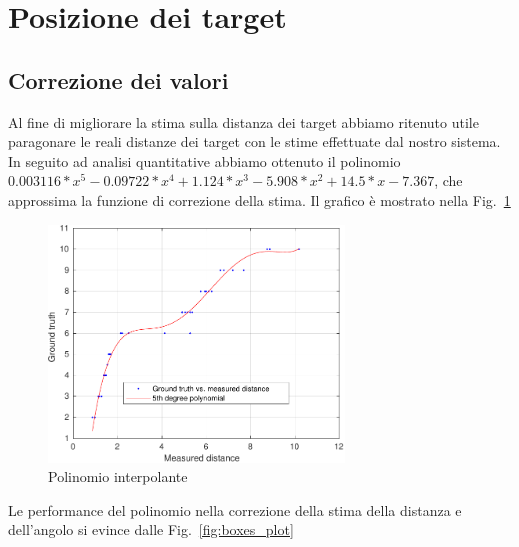 \documentclass[a4paper]{article}
\begin{document}
	\newpage
	\section{Posizione dei target}\label{sec:Posizione-dei-target}
	
	\subsection{Correzione dei valori}\label{subsec:Correzione-dei-valori}
	Al fine di migliorare la stima sulla distanza dei target abbiamo ritenuto
	utile paragonare le reali distanze dei target con le stime effettuate dal
	nostro sistema. In seguito ad analisi quantitative abbiamo ottenuto il
	polinomio 	$0.003116*x^5 - 0.09722*x^4 + 1.124*x^3 -5.908*x^2 +
	14.5*x-7.367$,  che approssima la funzione di correzione della stima. Il
	grafico è mostrato nella Fig.~\ref{fig:interpolation}
	
	\begin{figure}[H]
		\centering
		\includegraphics[width=0.7\textwidth]{./img/interpolation.pdf}
		\caption{Polinomio interpolante}
		\label{fig:interpolation}
	\end{figure}

	Le performance del polinomio nella correzione della stima della distanza e dell'angolo si evince dalle Fig.~\ref{fig:boxes_plot}
\end{document}
